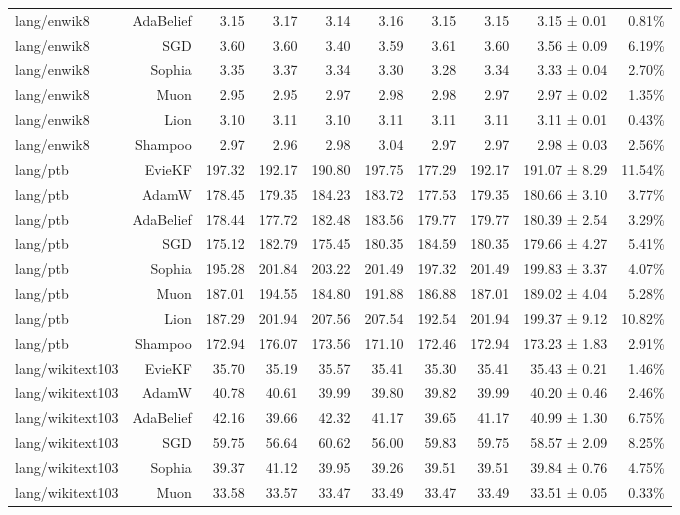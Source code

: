 \begin{table}[t]
\begin{tabular}{lrrrrrrrrr}
lang/enwik8 & AdaBelief & 3.15 & 3.17 & 3.14 & 3.16 & 3.15 & 3.15 & 3.15 ± 0.01 & 0.81\% \\
lang/enwik8 & SGD & 3.60 & 3.60 & 3.40 & 3.59 & 3.61 & 3.60 & 3.56 ± 0.09 & 6.19\% \\
lang/enwik8 & Sophia & 3.35 & 3.37 & 3.34 & 3.30 & 3.28 & 3.34 & 3.33 ± 0.04 & 2.70\% \\
lang/enwik8 & Muon & 2.95 & 2.95 & 2.97 & 2.98 & 2.98 & 2.97 & 2.97 ± 0.02 & 1.35\% \\
lang/enwik8 & Lion & 3.10 & 3.11 & 3.10 & 3.11 & 3.11 & 3.11 & 3.11 ± 0.01 & 0.43\% \\
lang/enwik8 & Shampoo & 2.97 & 2.96 & 2.98 & 3.04 & 2.97 & 2.97 & 2.98 ± 0.03 & 2.56\% \\
lang/ptb & EvieKF & 197.32 & 192.17 & 190.80 & 197.75 & 177.29 & 192.17 & 191.07 ± 8.29 & 11.54\% \\
lang/ptb & AdamW & 178.45 & 179.35 & 184.23 & 183.72 & 177.53 & 179.35 & 180.66 ± 3.10 & 3.77\% \\
lang/ptb & AdaBelief & 178.44 & 177.72 & 182.48 & 183.56 & 179.77 & 179.77 & 180.39 ± 2.54 & 3.29\% \\
lang/ptb & SGD & 175.12 & 182.79 & 175.45 & 180.35 & 184.59 & 180.35 & 179.66 ± 4.27 & 5.41\% \\
lang/ptb & Sophia & 195.28 & 201.84 & 203.22 & 201.49 & 197.32 & 201.49 & 199.83 ± 3.37 & 4.07\% \\
lang/ptb & Muon & 187.01 & 194.55 & 184.80 & 191.88 & 186.88 & 187.01 & 189.02 ± 4.04 & 5.28\% \\
lang/ptb & Lion & 187.29 & 201.94 & 207.56 & 207.54 & 192.54 & 201.94 & 199.37 ± 9.12 & 10.82\% \\
lang/ptb & Shampoo & 172.94 & 176.07 & 173.56 & 171.10 & 172.46 & 172.94 & 173.23 ± 1.83 & 2.91\% \\
lang/wikitext103 & EvieKF & 35.70 & 35.19 & 35.57 & 35.41 & 35.30 & 35.41 & 35.43 ± 0.21 & 1.46\% \\
lang/wikitext103 & AdamW & 40.78 & 40.61 & 39.99 & 39.80 & 39.82 & 39.99 & 40.20 ± 0.46 & 2.46\% \\
lang/wikitext103 & AdaBelief & 42.16 & 39.66 & 42.32 & 41.17 & 39.65 & 41.17 & 40.99 ± 1.30 & 6.75\% \\
lang/wikitext103 & SGD & 59.75 & 56.64 & 60.62 & 56.00 & 59.83 & 59.75 & 58.57 ± 2.09 & 8.25\% \\
lang/wikitext103 & Sophia & 39.37 & 41.12 & 39.95 & 39.26 & 39.51 & 39.51 & 39.84 ± 0.76 & 4.75\% \\
lang/wikitext103 & Muon & 33.58 & 33.57 & 33.47 & 33.49 & 33.47 & 33.49 & 33.51 ± 0.05 & 0.33\% \\

\end{tabular}
\end{table}
